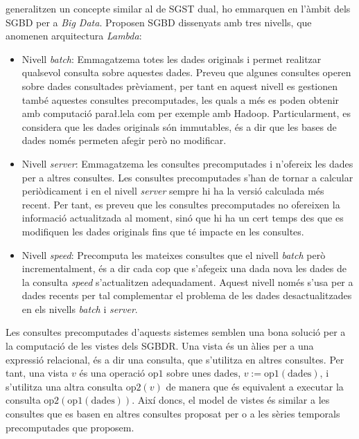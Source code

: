\textcite{marz13:nosql13, marz14:bigdata} generalitzen un concepte
similar al de \gls{SGST} dual, ho emmarquen en l'àmbit dels \gls{SGBD}
per a \emph{Big Data}.  Proposen \gls{SGBD} dissenyats amb tres
nivells, que anomenen arquitectura \emph{Lambda}:
\begin{itemize}
\item Nivell \emph{batch}: Emmagatzema totes les dades originals i
  permet realitzar qualsevol consulta sobre aquestes dades. Preveu que
  algunes consultes operen sobre dades consultades prèviament, per
  tant en aquest nivell es gestionen també aquestes consultes
  precomputades, les quals a més es poden obtenir amb computació
  para\l.lela com per exemple amb Hadoop. Particularment, es considera
  que les dades originals són immutables, és a dir que les bases de
  dades només permeten afegir però no modificar.

\item Nivell \emph{server}: Emmagatzema les consultes precomputades i
  n'ofereix les dades per a altres consultes. Les consultes
  precomputades s'han de tornar a calcular periòdicament i en el
  nivell \emph{server} sempre hi ha la versió calculada més
  recent. Per tant, es preveu que les consultes precomputades no
  ofereixen la informació actualitzada al moment, sinó que hi ha un
  cert temps des que es modifiquen les dades originals fins que té
  impacte en les consultes.

\item Nivell \emph{speed}: Precomputa les mateixes consultes que el
  nivell \emph{batch} però incrementalment, és a dir cada cop que
  s'afegeix una dada nova les dades de la consulta \emph{speed}
  s'actualitzen adequadament.  Aquest nivell només s'usa per a dades
  recents per tal complementar el problema de les dades
  desactualitzades en els nivells \emph{batch} i \emph{server}.
\end{itemize}


Les consultes precomputades d'aquests sistemes semblen una bona
solució per a la computació de les vistes dels \gls{SGBDR}.  Una vista
és un àlies per a una expressió relacional, és a dir una consulta, que
s'utilitza en altres consultes. Per tant, una vista $v$ és una
operació $\text{op1}$ sobre unes $\text{dades}$,
$v:=\text{op1}(\text{dades})$, i s'utilitza una altra consulta
$\text{op2}(v)$ de manera que és equivalent a executar la consulta
$\text{op2}(\text{op1}(\text{dades}))$. Així doncs, el model de vistes
és similar a les consultes que es basen en altres consultes proposat
per \citeauthor{marz14:bigdata} o a les sèries temporals precomputades
que proposem.


